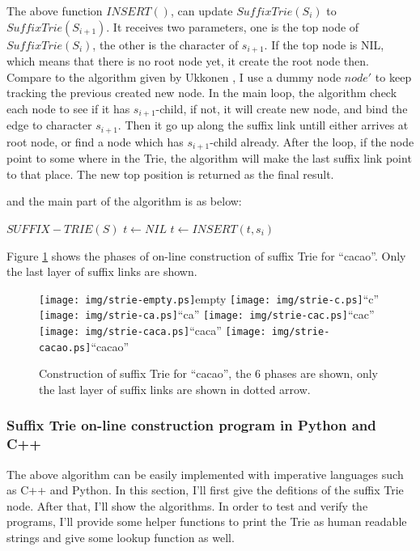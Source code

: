 \documentclass{article}
\begin{document}
The above function $INSERT()$, can update $SuffixTrie(S_i)$ to $SuffixTrie(S_{i+1})$.
It receives two parameters, one is the top node of $SuffixTrie(S_i)$, the other
is the character of $s_{i+1}$. If the top node is NIL, which means that there is
no root node yet, it create the root node then. Compare to the algorithm given
by Ukkonen \cite{ukkonen95}, I use a dummy node $node'$ to keep tracking the 
previous created new node. In the main loop, the algorithm check each node
to see if it has $s_{i+1}$-child, if not, it will create new node, and bind the 
edge to character $s_{i+1}$. Then it go up along the suffix link untill either
arrives at root node, or find a node which has $s_{i+1}$-child already. After
the loop, if the node point to some where in the Trie, the algorithm will 
make the last suffix link point to that place. The new top position is returned
as the final result.

and the main part of the algorithm is as below:
\begin{algorithmic}
\STATE $SUFFIX-TRIE(S)$
  \STATE $t \leftarrow NIL$
    \STATE $t \leftarrow INSERT(t, s_i)$
  \ENDFOR
\end{algorithmic}

Figure \ref{fig:cons-strie-cacao} shows the phases of on-line construction
of suffix Trie for ``cacao''. Only the last layer of suffix links are shown.

\begin{figure}[htbp]
   \begin{center}
     \texttt{[image: img/strie-empty.ps]}empty
     \texttt{[image: img/strie-c.ps]}``c''
     \texttt{[image: img/strie-ca.ps]}``ca''
     \texttt{[image: img/strie-cac.ps]}``cac'' \newline
     \texttt{[image: img/strie-caca.ps]}``caca''
     \texttt{[image: img/strie-cacao.ps]}``cacao''
     \caption{Construction of suffix Trie for ``cacao'', the 6 phases are shown, only the last layer of suffix links are shown in dotted arrow.}
     \label{fig:cons-strie-cacao}
   \end{center}
\end{figure}


\subsubsection{Suffix Trie on-line construction program in Python and C++}
The above algorithm can be easily implemented with imperative languages such as C++ and Python.
In this section, I'll first give the defitions of the suffix Trie node. After that, I'll
show the algorithms. In order to test and verify the programs, I'll provide some helper
functions to print the Trie as human readable strings and give some lookup function as well.
\end{document}
